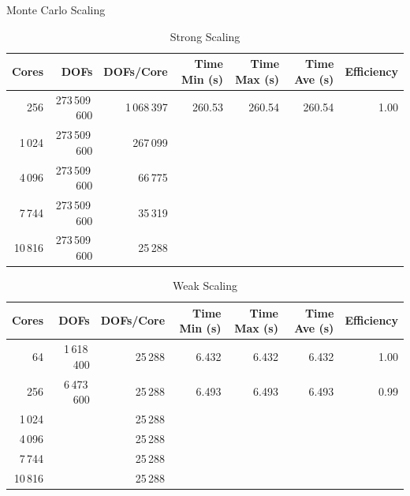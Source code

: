 \documentclass{beamer}
\begin{document}
\begin{frame}{Monte Carlo Scaling}

  \vspace{-0.1in}
  
  \begin{table}[htb!]
    \tiny
    \begin{center}
      \begin{tabular}{rrrrrrr}
        \toprule
        \multicolumn{1}{r}{Cores} &
        \multicolumn{1}{r}{DOFs} &
        \multicolumn{1}{r}{DOFs/Core} &
        \multicolumn{1}{r}{Time Min (s)} &
        \multicolumn{1}{r}{Time Max (s)} &
        \multicolumn{1}{r}{Time Ave (s)} &
        \multicolumn{1}{r}{Efficiency}
        \\ \midrule
        256 & 273\,509\,600 & 1\,068\,397 & 260.53 & 260.54 & 260.54 & 1.00 \\
        1\,024 & 273\,509\,600 & 267\,099 & & & & \\
        4\,096 & 273\,509\,600 & 66\,775 & & & & \\
        7\,744 & 273\,509\,600 & 35\,319 & & & & \\
        10\,816 & 273\,509\,600 & 25\,288 & & & & \\
        \bottomrule
      \end{tabular}
    \end{center}
    \vspace{-0.09in}
    \caption{\small Strong Scaling}
  \end{table} 

  \vspace{-0.2in}
  
  \begin{table}[htb!]
    \tiny
    \begin{center}
      \begin{tabular}{rrrrrrr}
        \toprule
        \multicolumn{1}{r}{Cores} &
        \multicolumn{1}{r}{DOFs} &
        \multicolumn{1}{r}{DOFs/Core} &
        \multicolumn{1}{r}{Time Min (s)} &
        \multicolumn{1}{r}{Time Max (s)} &
        \multicolumn{1}{r}{Time Ave (s)} &
        \multicolumn{1}{r}{Efficiency}
        \\ \midrule
        64 & 1\,618\,400 & 25\,288 & 6.432 & 6.432 & 6.432 & 1.00 \\
        256 & 6\,473\,600 & 25\,288 & 6.493 & 6.493 & 6.493 & 0.99 \\
        1\,024 & & 25\,288 & & & & \\
        4\,096 & & 25\,288 & & & & \\
        7\,744 & & 25\,288 & & & & \\
        10\,816 & & 25\,288 & & & & \\
        \bottomrule
      \end{tabular}
    \end{center}
    \vspace{-0.09in}
    \caption{\small Weak Scaling}
  \end{table}


\end{frame}
\end{document}
